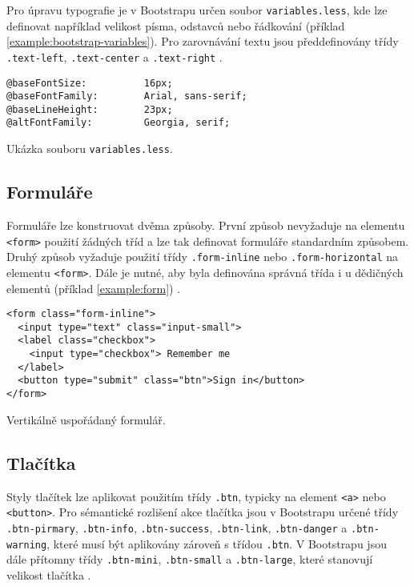 Pro úpravu typografie je v Bootstrapu určen soubor \texttt{variables.less}, kde lze definovat například velikost písma, odstavců nebo řádkování (příklad \ref{example:bootstrap-variables}). Pro zarovnávání textu jsou předdefinovány třídy \texttt{.text-left}, \texttt{.text-center} a \texttt{.text-right} \cite{19}.

\begin{example}
    \centering
    \begin{lstlisting}
@baseFontSize:          16px;
@baseFontFamily:        Arial, sans-serif;
@baseLineHeight:        23px;
@altFontFamily:         Georgia, serif;
    \end{lstlisting}
    \caption{Ukázka souboru \texttt{variables.less}.}
    \label{example:bootstrap-variables}
\end{example}

\subsection{Formuláře}

Formuláře lze konstruovat dvěma způsoby. První způsob nevyžaduje na elementu \texttt{<form>} použití žádných tříd a lze tak definovat formuláře standardním způsobem. Druhý způsob vyžaduje použití třídy \texttt{.form-inline} nebo \texttt{.form-horizontal} na elementu \texttt{<form>}. Dále je nutné, aby byla definována správná třída i u dědičných elementů (příklad \ref{example:form}) \cite{19}.

\begin{example}
    \centering
    \begin{lstlisting}
<form class="form-inline">
  <input type="text" class="input-small">
  <label class="checkbox">
    <input type="checkbox"> Remember me
  </label>
  <button type="submit" class="btn">Sign in</button>
</form>
    \end{lstlisting}
    \caption{Vertikálně uspořádaný formulář.}
    \label{example:form}
\end{example}

\subsection{Tlačítka}

Styly tlačítek lze aplikovat použitím třídy \texttt{.btn}, typicky na element \texttt{<a>} nebo \texttt{<button>}. Pro sémantické rozlišení akce tlačítka jsou v Bootstrapu určené třídy \texttt{.btn-pirmary}, \texttt{.btn-info}, \texttt{.btn-success}, \texttt{.btn-link}, \texttt{.btn-danger} a \texttt{.btn-warning}, které musí být aplikovány zároveň s třídou \texttt{.btn}. V Bootstrapu jsou dále přítomny třídy \texttt{.btn-mini}, \texttt{.btn-small} a \texttt{.btn-large}, které stanovují velikost tlačítka \cite{19}.


